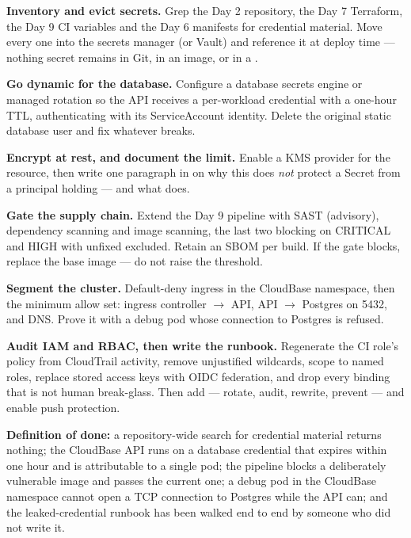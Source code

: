 \begin{buildalong}
\begin{wbitem}
  \item \textbf{Inventory and evict secrets.} Grep the Day 2 repository, the Day 7 Terraform, the Day 9 CI variables and the Day 6 manifests for credential material. Move every one into the secrets manager (or Vault) and reference it at deploy time --- nothing secret remains in Git, in an image, or in a .
  \item \textbf{Go dynamic for the database.} Configure a database secrets engine or managed rotation so the API receives a per-workload credential with a one-hour TTL, authenticating with its ServiceAccount identity. Delete the original static database user and fix whatever breaks.
  \item \textbf{Encrypt at rest, and document the limit.} Enable a KMS provider for the  resource, then write one paragraph in  on why this does \emph{not} protect a Secret from a principal holding  --- and what does.
  \item \textbf{Gate the supply chain.} Extend the Day 9 pipeline with SAST (advisory), dependency scanning and image scanning, the last two blocking on CRITICAL and HIGH with unfixed excluded. Retain an SBOM per build. If the gate blocks, replace the base image --- do not raise the threshold.
  \item \textbf{Segment the cluster.} Default-deny ingress in the CloudBase namespace, then the minimum allow set: ingress controller $\rightarrow$ API, API $\rightarrow$ Postgres on 5432, and DNS. Prove it with a debug pod whose connection to Postgres is refused.
  \item \textbf{Audit IAM and RBAC, then write the runbook.} Regenerate the CI role's policy from CloudTrail activity, remove unjustified wildcards, scope  to named roles, replace stored access keys with OIDC federation, and drop every  binding that is not human break-glass. Then add  --- rotate, audit, rewrite, prevent --- and enable push protection.
\end{wbitem}
\smallskip\textbf{Definition of done:} a repository-wide search for credential material returns nothing; the CloudBase API runs on a database credential that expires within one hour and is attributable to a single pod; the pipeline blocks a deliberately vulnerable image and passes the current one; a debug pod in the CloudBase namespace cannot open a TCP connection to Postgres while the API can; and the leaked-credential runbook has been walked end to end by someone who did not write it.
\end{buildalong}

